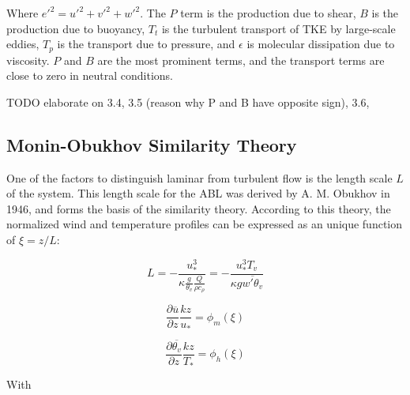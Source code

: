 \documentclass[12pt]{book}
\begin{document}
Where ${e'}^2={u'}^2+{v'}^2+{w'}^2$. The $P$ term is the production due to shear, $B$ is the production due to buoyancy, $T_t$ is the turbulent transport of TKE by large-scale eddies, $T_p$ is the transport due to pressure, and $\epsilon$ is molecular dissipation due to viscosity. $P$ and $B$ are the most prominent terms, and the transport terms are close to zero in neutral conditions.

TODO elaborate on 3.4, 3.5 (reason why P and B have opposite sign), 3.6, 

\subsection{Monin-Obukhov Similarity Theory}
\label{sec:most}
One of the factors to distinguish laminar from turbulent flow is the length scale $L$ of the system. This length scale for the ABL was derived by A. M. Obukhov in 1946, and forms the basis of the similarity theory. According to this theory, the normalized wind and temperature profiles can be expressed as an unique function of $\xi=z/L$:

\begin{equation}
\label{eq:most_l}
L=-\frac{u_*^3}{\kappa\frac{g}{\theta_v}\frac{Q}{\rho c_\rho}}
=-\frac{u_*^3 T_v}{\kappa g \overline{w'\theta_v}}
\end{equation}

\begin{equation}
\label{eq:phi_m}
\frac{\partial\overline{u}}{\partial z}\frac{kz}{u_*}=\phi_m(\xi)
\end{equation}

\begin{equation}
\label{eq:phi_h}
\frac{\partial\overline{\theta_v}}{\partial z}\frac{kz}{T_*}=\phi_h(\xi)
\end{equation}

With
\end{document}
